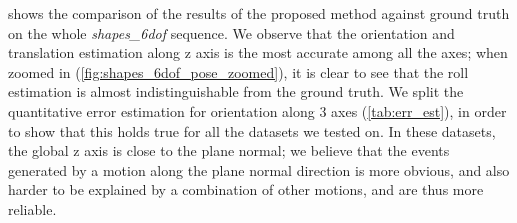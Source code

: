  shows the comparison of the results of the
proposed method against ground truth on the whole
\textit{shapes\_6dof} sequence. We observe that the orientation and
translation estimation along z axis is the most accurate among all the
axes; when zoomed in (\cref{fig:shapes_6dof_pose_zoomed}), it is clear
to see that the roll estimation is almost indistinguishable from the
ground truth. We split the quantitative error estimation for
orientation along 3 axes (\cref{tab:err_est}), in order to show that
this holds true for all the datasets we tested on. In these datasets,
the global z axis is close to the plane normal; we believe that the
events generated by a motion along the plane normal direction is more
obvious, and also harder to be explained by a combination of other
motions, and are thus more reliable.

